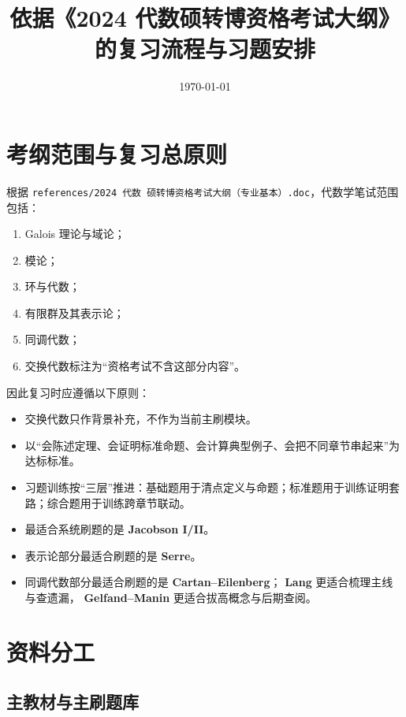 \documentclass[12pt,a4paper]{ctexart}
\title{依据《2024 代数硕转博资格考试大纲》的复习流程与习题安排}
\author{}
\date{\today}
\begin{document}
\maketitle

\section{考纲范围与复习总原则}

根据 \texttt{references/2024 代数 硕转博资格考试大纲（专业基本）.doc}，代数学笔试范围包括：
\begin{enumerate}
  \item Galois 理论与域论；
  \item 模论；
  \item 环与代数；
  \item 有限群及其表示论；
  \item 同调代数；
  \item 交换代数标注为“资格考试不含这部分内容”。
\end{enumerate}

因此复习时应遵循以下原则：
\begin{itemize}
  \item 交换代数只作背景补充，不作为当前主刷模块。
  \item 以“会陈述定理、会证明标准命题、会计算典型例子、会把不同章节串起来”为达标标准。
  \item 习题训练按“三层”推进：基础题用于清点定义与命题；标准题用于训练证明套路；综合题用于训练跨章节联动。
  \item 最适合系统刷题的是 \textbf{Jacobson I/II}。
  \item 表示论部分最适合刷题的是 \textbf{Serre}。
  \item 同调代数部分最适合刷题的是 \textbf{Cartan--Eilenberg}；
  \textbf{Lang} 更适合梳理主线与查遗漏，
  \textbf{Gelfand--Manin} 更适合拔高概念与后期查阅。
\end{itemize}

\section{资料分工}

\subsection{主教材与主刷题库}
\end{document}
